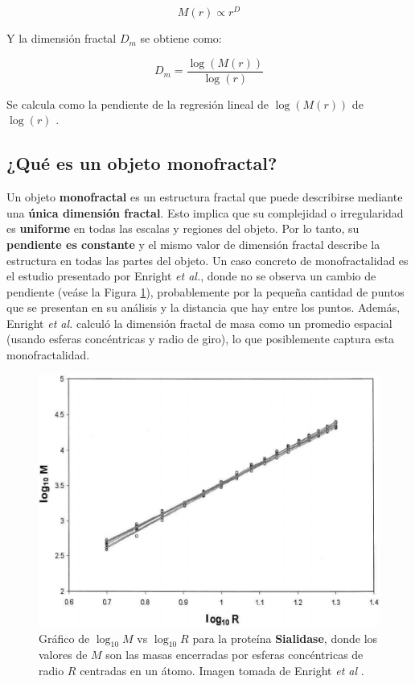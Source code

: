\begin{equation}
	M(r) \propto r^{D} 
\end{equation}

Y la dimensi\'{o}n fractal $D_\textit{{m}}$ se obtiene como:

\begin{equation}
	D_\textit{m} = \frac{\log (M(r))}{\log (r)}
\end{equation}

Se calcula como la pendiente de la regresi\'{o}n lineal de $\log(M(r))$ de $\log(r)$ \cite{Mustafa1996}.

\subsection*{¿Qu\'{e} es un objeto monofractal?}

Un objeto \textbf{monofractal} es un estructura fractal que puede describirse mediante una \textbf{\'{u}nica dimensi\'{o}n fractal}. Esto implica que su complejidad o irregularidad es \textbf{uniforme} en todas las escalas y regiones del objeto. Por lo tanto, su \textbf{pendiente es constante} y el mismo valor de dimensi\'{o}n fractal describe la estructura en todas las partes del objeto. Un caso concreto de monofractalidad es el estudio presentado por Enright \textit{et al.}\cite{Enright2005}, donde no se observa un cambio de pendiente (ve\'{a}se la Figura \ref{fig:Enright-Fractal}), probablemente por la pequeña cantidad de puntos que se presentan en su an\'{a}lisis y la distancia que hay entre los puntos. Adem\'{a}s, Enright \textit{et al.} calcul\'{o} la dimensi\'{o}n fractal de masa como un promedio espacial (usando esferas conc\'{e}ntricas y radio de giro), lo que posiblemente captura esta monofractalidad.

\begin{figure}[H]
	\begin{center}
		\includegraphics[width=0.4\linewidth]{graphs/Enright2005}
		\caption{Gr\'{a}fico de $\log_{10}M$ vs $\log_{10}R$ para la prote\'{i}na \textbf{Sialidase}, donde los valores de $M$ son las masas encerradas por esferas conc\'{e}ntricas de radio $R$ centradas en un \'{a}tomo. Imagen tomada de Enright \textit{et al} \cite{Enright2005}.}
		\label{fig:Enright-Fractal}
	\end{center}
\end{figure}

